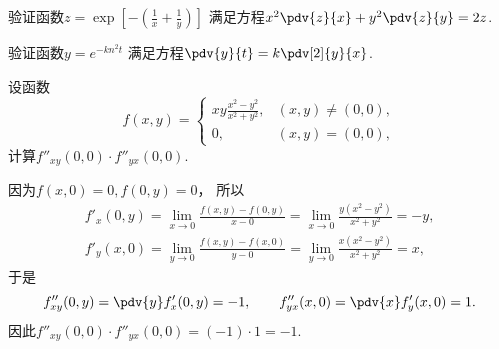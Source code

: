 \begin{example}
验证函数\(z = \exp[-\left(\frac{1}{x}+\frac{1}{y}\right)]\)
满足方程\(x^2 \pdv{z}{x} + y^2 \pdv{z}{y} = 2z\).
\end{example}

\begin{example}
验证函数\(y = e^{-k n^2 t}\)
满足方程\(\pdv{y}{t} = k \pdv[2]{y}{x}\).
\end{example}

\begin{example}
设函数\[
	f(x,y) = \left\{ \begin{array}{cl}
		x y \frac{x^2 - y^2}{x^2 + y^2}, & (x,y)\neq(0,0), \\
		0, & (x,y)=(0,0),
	\end{array} \right.
\]
计算\(f''_{xy}(0,0) \cdot f''_{yx}(0,0)\).
\begin{solution}
因为\(f(x,0) = 0,
f(0,y) = 0\)，
所以\begin{gather*}
	f'_x(0,y) = \lim_{x\to0} \frac{f(x,y) - f(0,y)}{x - 0}
	= \lim_{x\to0} \frac{y (x^2 - y^2)}{x^2 + y^2}
	= -y, \\
	f'_y(x,0) = \lim_{y\to0} \frac{f(x,y) - f(x,0)}{y - 0}
	= \lim_{y\to0} \frac{x (x^2 - y^2)}{x^2 + y^2}
	= x,
\end{gather*}
于是\[
	f''_{xy}(0,y) = \pdv{y} f'_x(0,y) = -1,
	\qquad
	f''_{yx}(x,0) = \pdv{x} f'_y(x,0) = 1.
\]
因此\(f''_{xy}(0,0) \cdot f''_{yx}(0,0) = (-1)\cdot1 = -1\).
\end{solution}
\end{example}
